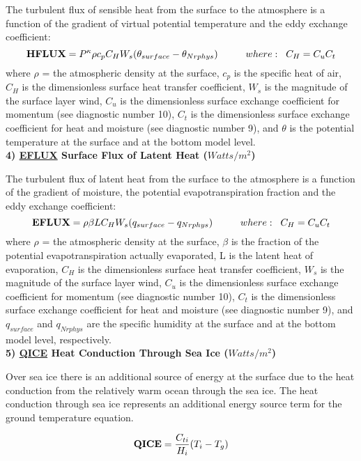 The turbulent flux of sensible heat from the surface to the atmosphere is a function of the
gradient of virtual potential temperature and the eddy exchange coefficient:
\[
{\bf HFLUX} =  P^{\kappa}\rho c_{p} C_{H} W_s (\theta_{surface} - \theta_{Nrphys})
\hspace{1cm}where: \hspace{.2cm}C_H = C_u C_t
\]
where $\rho$ = the atmospheric density at the surface, $c_{p}$ is the specific
heat of air, $C_{H}$ is the dimensionless surface heat transfer coefficient, $W_s$ is the 
magnitude of the surface layer wind, $C_u$ is the dimensionless surface exchange coefficient 
for momentum (see diagnostic number 10), $C_t$ is the dimensionless surface exchange coefficient 
for heat and moisture (see diagnostic number 9), and $\theta$ is the potential temperature 
at the surface and at the bottom model level.
\\


{\bf 4)  \underline {EFLUX} Surface Flux of Latent Heat ($Watts/m^2$) } 

The turbulent flux of latent heat from the surface to the atmosphere is a function of the
gradient of moisture, the potential evapotranspiration fraction and the eddy exchange coefficient:
\[
{\bf EFLUX} =  \rho \beta L C_{H} W_s (q_{surface} - q_{Nrphys})
\hspace{1cm}where: \hspace{.2cm}C_H = C_u C_t
\]
where $\rho$ = the atmospheric density at the surface, $\beta$ is the fraction of
the potential evapotranspiration actually evaporated, L is the latent
heat of evaporation, $C_{H}$ is the dimensionless surface heat transfer coefficient, $W_s$ is the 
magnitude of the surface layer wind, $C_u$ is the dimensionless surface exchange coefficient 
for momentum (see diagnostic number 10), $C_t$ is the dimensionless surface exchange coefficient 
for heat and moisture (see diagnostic number 9), and $q_{surface}$ and $q_{Nrphys}$ are the specific
humidity at the surface and at the bottom model level, respectively.
\\

{\bf 5)  \underline {QICE} Heat Conduction Through Sea Ice ($Watts/m^2$) } 

Over sea ice there is an additional source of energy at the surface due to the heat
conduction from the relatively warm ocean through the sea ice. The heat conduction
through sea ice represents an additional energy source term for the ground temperature equation.

\[
{\bf QICE} = {C_{ti} \over {H_i}} (T_i-T_g)
\]

